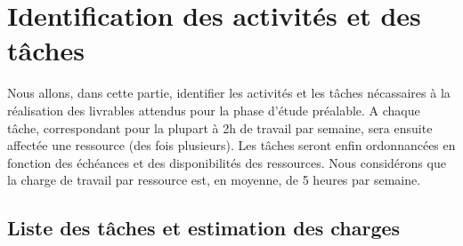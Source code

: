 \chapter{Identification des activités et des tâches}

Nous allons, dans cette partie, identifier les activités et les tâches nécassaires à la réalisation des livrables attendus pour la phase d'étude préalable. A chaque tâche, correspondant pour la plupart à 2h de travail par semaine, sera ensuite affectée une ressource (des fois plusieurs). Les tâches seront enfin ordonnancées en fonction des échéances et des disponibilités des ressources. Nous considérons que la charge de travail par ressource est, en moyenne, de 5 heures par semaine.

\section{Liste des tâches et estimation des charges}

